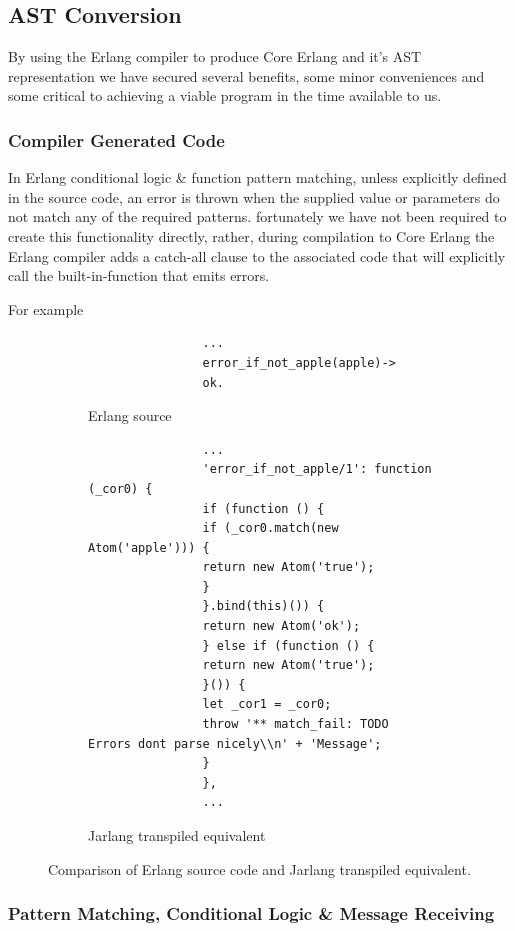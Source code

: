\documentclass[twoside,12pt,titlepage,a4paper]{article}
\begin{document}
\subsection{AST Conversion}
	By using the Erlang compiler to produce Core Erlang and it's AST representation we have secured several benefits, some minor conveniences and some critical to achieving a viable program in the time available to us.
\subsubsection{Compiler Generated Code}
	In Erlang conditional logic \& function pattern matching, unless explicitly defined in the source code, an error is thrown when the supplied value or parameters do not match any of the required patterns. fortunately we have not been required to create this functionality directly, rather, during compilation to Core Erlang the Erlang compiler adds a catch-all clause to the associated code that will explicitly call the built-in-function that emits errors.
	
	For example
	\begin{figure}[htb]
		\centering
		\begin{subfigure}[t]{.5\linewidth}
			\centering         
				\begin{verbatim}
				...
				error_if_not_apple(apple)->
				ok.
				\end{verbatim}
			\caption{Erlang source}
		\end{subfigure}%
		\begin{subfigure}[t]{.5\linewidth}
			\centering
				\begin{verbatim}
				...
				'error_if_not_apple/1': function (_cor0) {
				if (function () {
				if (_cor0.match(new Atom('apple'))) {
				return new Atom('true');
				}
				}.bind(this)()) {
				return new Atom('ok');
				} else if (function () {
				return new Atom('true');
				}()) {
				let _cor1 = _cor0;
				throw '** match_fail: TODO Errors dont parse nicely\\n' + 'Message';
				}
				},
				...
				\end{verbatim}
			\caption{Jarlang transpiled equivalent}
		\end{subfigure}
		\caption{Comparison of Erlang source code and Jarlang transpiled equivalent.}
	\end{figure}
	
	
\subsubsection{Pattern Matching, Conditional Logic \& Message Receiving}
\end{document}
